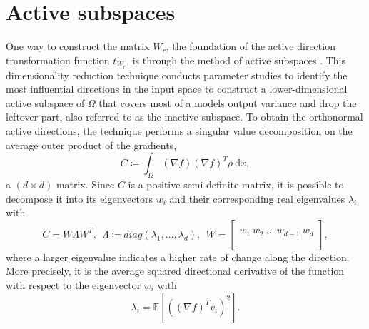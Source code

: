 \documentclass[
  a4paper,  %
  twoside,  %
  bibliography=totoc,
  headsepline,
  cleardoublepage=empty,
  parskip=half,
  draft=false
]{scrbook}
\begin{document}
\section{Active subspaces}
\label{sec:as}

One way to construct the matrix $W_r$, the foundation of the active direction transformation function $t_{W_r}$, is through the method of active subspaces \cite{Constantine2015}.
This dimensionality reduction technique conducts parameter studies to identify the most influential directions in the input space to construct a lower-dimensional active subspace of $\Omega$ that covers most of a models output variance and drop the leftover part, also referred to as the inactive subspace.
To obtain the orthonormal active directions, the technique performs a singular value decomposition on the average outer product of the gradients,
\begin{equation}
C \coloneqq \int_{\Omega} (\nabla f) (\nabla f)^T \rho ~ \mathrm{d}x,
\label{eq:as_c}
\end{equation}
a $(d \times d)$ matrix.
Since $C$ is a positive semi-definite matrix, it is possible to decompose it into its eigenvectors $w_i$ and their corresponding real eigenvalues $\lambda_i$ with
\begin{equation}
C = W \Lambda W^T, ~~ \Lambda \coloneqq diag(\lambda_1, \dots, \lambda_d), ~~ W =
  \begin{bmatrix}
  \\
    w_1 ~ w_2 ~ \dots ~ w_{d-1} ~ w_d\\
    \\
  \end{bmatrix},
\end{equation}
where a larger eigenvalue indicates a higher rate of change along the direction.
More precisely, it is the average squared directional derivative of the function with respect to the eigenvector $w_i$ \cite{Constantine2014} with
\begin{equation}
\lambda_i=\mathds{E}\left[\left(\left(\nabla f\right)^T v_i\right)^2\right].
\label{eigenvalues}
\end{equation}
\end{document}
